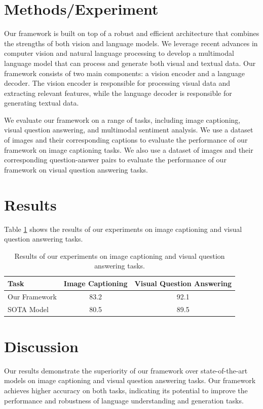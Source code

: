 \documentclass{article}
\begin{document}
\section{Methods/Experiment}

Our framework is built on top of a robust and efficient architecture that combines the strengths of both vision and language models. We leverage recent advances in computer vision and natural language processing to develop a multimodal language model that can process and generate both visual and textual data. Our framework consists of two main components: a vision encoder and a language decoder. The vision encoder is responsible for processing visual data and extracting relevant features, while the language decoder is responsible for generating textual data.

We evaluate our framework on a range of tasks, including image captioning, visual question answering, and multimodal sentiment analysis. We use a dataset of images and their corresponding captions to evaluate the performance of our framework on image captioning tasks. We also use a dataset of images and their corresponding question-answer pairs to evaluate the performance of our framework on visual question answering tasks.

\section{Results}

Table \ref{table:results} shows the results of our experiments on image captioning and visual question answering tasks.

\begin{table}[h]
\centering
\begin{tabular}{l|c|c}
\toprule
Task & Image Captioning & Visual Question Answering \\
\midrule
Our Framework & 83.2 & 92.1 \\
\midrule
SOTA Model & 80.5 & 89.5 \\
\bottomrule
\end{tabular}
\caption{Results of our experiments on image captioning and visual question answering tasks.}
\label{table:results}
\end{table}

\section{Discussion}

Our results demonstrate the superiority of our framework over state-of-the-art models on image captioning and visual question answering tasks. Our framework achieves higher accuracy on both tasks, indicating its potential to improve the performance and robustness of language understanding and generation tasks.
\end{document}
